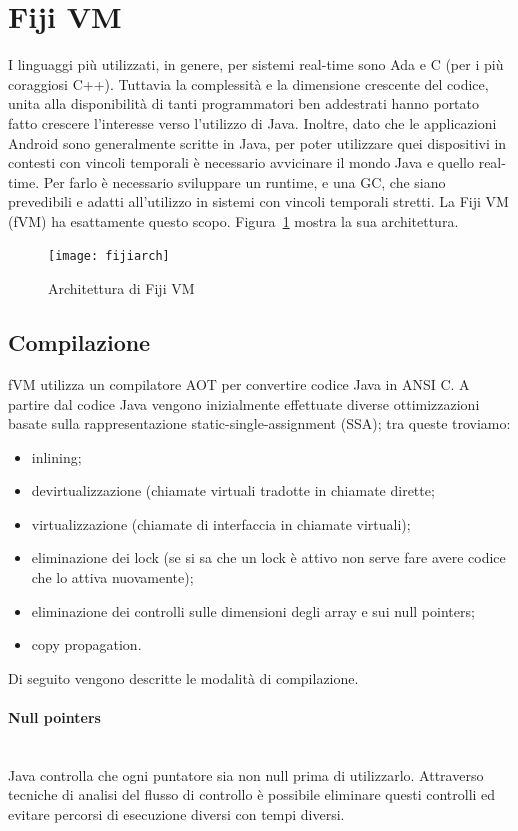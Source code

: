 \section{Fiji VM}
I linguaggi più utilizzati, in genere, per sistemi real-time sono Ada e C (per i più coraggiosi C++). Tuttavia la complessità e la dimensione crescente del codice, unita alla disponibilità di tanti programmatori ben addestrati hanno portato fatto crescere l'interesse verso l'utilizzo di Java. Inoltre, dato che le applicazioni Android sono generalmente scritte in Java, per poter utilizzare quei dispositivi in contesti con vincoli temporali è necessario avvicinare il mondo Java e quello real-time. Per farlo è necessario sviluppare un runtime, e una GC, che siano prevedibili e adatti all'utilizzo in sistemi con vincoli temporali stretti. La Fiji VM (fVM) ha esattamente questo scopo. Figura~\ref{fig:fijiarch} mostra la sua architettura.
\begin{figure}
	\centering
	\texttt{[image: fijiarch]}
	\caption[Architettura di Fiji VM]{Architettura di Fiji VM}
	\label{fig:fijiarch}
\end{figure}

\subsection{Compilazione}
fVM utilizza un compilatore AOT per convertire codice Java in ANSI C. A partire dal codice Java vengono inizialmente effettuate diverse ottimizzazioni basate sulla rappresentazione static-single-assignment (SSA); tra queste troviamo:
\begin{itemize}
	\item inlining;
	\item devirtualizzazione (chiamate virtuali tradotte in chiamate dirette;
	\item virtualizzazione (chiamate di interfaccia in chiamate virtuali);
	\item eliminazione dei lock (se si sa che un lock è attivo non serve fare avere codice che lo attiva nuovamente);
	\item eliminazione dei controlli sulle dimensioni degli array e sui null pointers;
	\item copy propagation.
\end{itemize}
Di seguito vengono descritte le modalità di compilazione.

\paragraph{Null pointers} \mbox{} \\
Java controlla che ogni puntatore sia non null prima di utilizzarlo. Attraverso tecniche di analisi del flusso di controllo è possibile eliminare questi controlli ed evitare percorsi di esecuzione diversi con tempi diversi.

